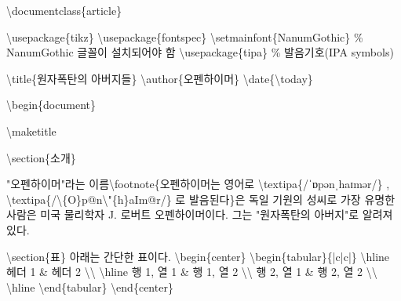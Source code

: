 \documentclass[
  letterpaper,
]{book}
\newenvironment{Shaded}{\begin{snugshade}}{\end{snugshade}}
\newcommand{\BuiltInTok}[1]{\textcolor[rgb]{0.00,0.23,0.31}{#1}}
\newcommand{\CommentTok}[1]{\textcolor[rgb]{0.37,0.37,0.37}{#1}}
\newcommand{\ExtensionTok}[1]{\textcolor[rgb]{0.00,0.23,0.31}{#1}}
\newcommand{\FunctionTok}[1]{\textcolor[rgb]{0.28,0.35,0.67}{#1}}
\newcommand{\KeywordTok}[1]{\textcolor[rgb]{0.00,0.23,0.31}{#1}}
\newcommand{\NormalTok}[1]{\textcolor[rgb]{0.00,0.23,0.31}{#1}}
\newcommand{\OperatorTok}[1]{\textcolor[rgb]{0.37,0.37,0.37}{#1}}
\begin{document}
\begin{Shaded}
\begin{Highlighting}[]
\BuiltInTok{\textbackslash{}documentclass}\NormalTok{\{}\ExtensionTok{article}\NormalTok{\}}

\BuiltInTok{\textbackslash{}usepackage}\NormalTok{\{}\ExtensionTok{tikz}\NormalTok{\}}
\BuiltInTok{\textbackslash{}usepackage}\NormalTok{\{}\ExtensionTok{fontspec}\NormalTok{\}}
\FunctionTok{\textbackslash{}setmainfont}\NormalTok{\{NanumGothic\} }\CommentTok{\% NanumGothic 글꼴이 설치되어야 함}
\BuiltInTok{\textbackslash{}usepackage}\NormalTok{\{}\ExtensionTok{tipa}\NormalTok{\} }\CommentTok{\% 발음기호(IPA symbols)}

\FunctionTok{\textbackslash{}title}\NormalTok{\{원자폭탄의 아버지들\}}
\FunctionTok{\textbackslash{}author}\NormalTok{\{오펜하이머\}}
\FunctionTok{\textbackslash{}date}\NormalTok{\{}\FunctionTok{\textbackslash{}today}\NormalTok{\}}

\KeywordTok{\textbackslash{}begin}\NormalTok{\{}\ExtensionTok{document}\NormalTok{\}}

\FunctionTok{\textbackslash{}maketitle}

\KeywordTok{\textbackslash{}section}\NormalTok{\{소개\}}

\NormalTok{"오펜하이머"라는 이름}\FunctionTok{\textbackslash{}footnote}\NormalTok{\{오펜하이머는 영어로 }\FunctionTok{\textbackslash{}textipa}\NormalTok{\{/ˈɒpənˌhaɪmər/\} , }\FunctionTok{\textbackslash{}textipa}\NormalTok{\{/}\FunctionTok{\textbackslash{}\textquotesingle{}}\NormalTok{\{O\}p@n}\FunctionTok{\textbackslash{}"}\NormalTok{\{h\}aIm@r/\} 로 발음된다\}은 독일 기원의 성씨로 가장 유명한 사람은 미국 물리학자 J. 로버트 오펜하이머이다. 그는 "원자폭탄의 아버지"로 알려져 있다.}

\KeywordTok{\textbackslash{}section}\NormalTok{\{표\}}
\NormalTok{아래는 간단한 표이다.}
\KeywordTok{\textbackslash{}begin}\NormalTok{\{}\ExtensionTok{center}\NormalTok{\}}
\KeywordTok{\textbackslash{}begin}\NormalTok{\{}\ExtensionTok{tabular}\NormalTok{\}\{|c|c|\}}
\FunctionTok{\textbackslash{}hline}
\NormalTok{헤더 1 }\OperatorTok{\&}\NormalTok{ 헤더 2 }\FunctionTok{\textbackslash{}\textbackslash{}}
\FunctionTok{\textbackslash{}hline}
\NormalTok{행 1, 열 1 }\OperatorTok{\&}\NormalTok{ 행 1, 열 2 }\FunctionTok{\textbackslash{}\textbackslash{}}
\NormalTok{행 2, 열 1 }\OperatorTok{\&}\NormalTok{ 행 2, 열 2 }\FunctionTok{\textbackslash{}\textbackslash{}}
\FunctionTok{\textbackslash{}hline}
\KeywordTok{\textbackslash{}end}\NormalTok{\{}\ExtensionTok{tabular}\NormalTok{\}}
\KeywordTok{\textbackslash{}end}\NormalTok{\{}\ExtensionTok{center}\NormalTok{\}}


\end{Highlighting}
\end{Shaded}
\end{document}
